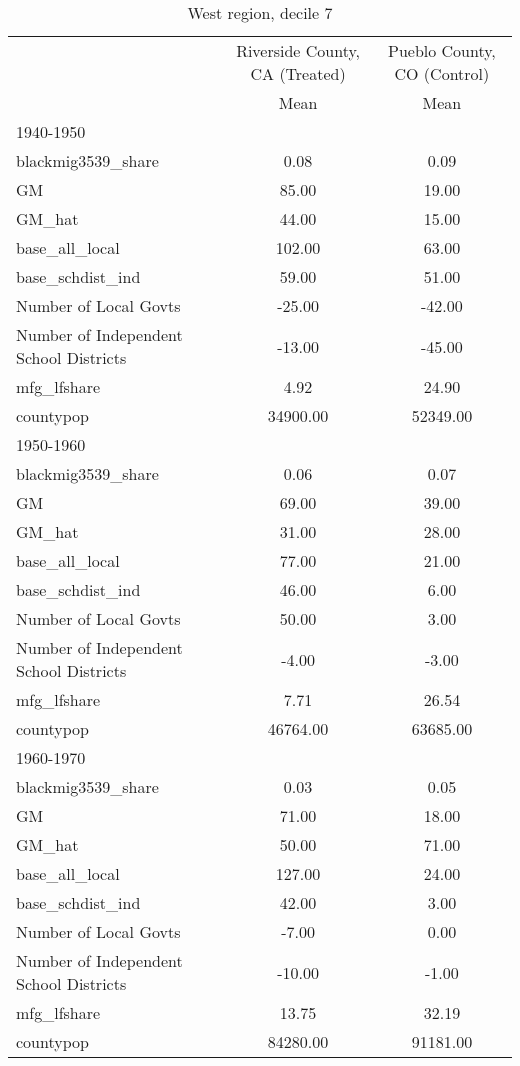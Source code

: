 \begin{table}[htbp]\centering
\def\sym#1{\ifmmode^{#1}\else\(^{#1}\)\fi}
\caption{West region, decile 7 \label{tab1}}
\begin{tabular}{l*{2}{c}}
\toprule
                    &\multicolumn{1}{c}{Riverside County, CA (Treated)}&\multicolumn{1}{c}{Pueblo County, CO (Control)}\\
                    &        Mean&        Mean\\
\midrule
1940-1950           &            &            \\
blackmig3539\_share  &        0.08&        0.09\\
GM                  &       85.00&       19.00\\
GM\_hat              &       44.00&       15.00\\
base\_all\_local      &      102.00&       63.00\\
base\_schdist\_ind    &       59.00&       51.00\\
Number of Local Govts&      -25.00&      -42.00\\
Number of Independent School Districts&      -13.00&      -45.00\\
mfg\_lfshare         &        4.92&       24.90\\
countypop           &    34900.00&    52349.00\\
\midrule
1950-1960           &            &            \\
blackmig3539\_share  &        0.06&        0.07\\
GM                  &       69.00&       39.00\\
GM\_hat              &       31.00&       28.00\\
base\_all\_local      &       77.00&       21.00\\
base\_schdist\_ind    &       46.00&        6.00\\
Number of Local Govts&       50.00&        3.00\\
Number of Independent School Districts&       -4.00&       -3.00\\
mfg\_lfshare         &        7.71&       26.54\\
countypop           &    46764.00&    63685.00\\
\midrule
1960-1970           &            &            \\
blackmig3539\_share  &        0.03&        0.05\\
GM                  &       71.00&       18.00\\
GM\_hat              &       50.00&       71.00\\
base\_all\_local      &      127.00&       24.00\\
base\_schdist\_ind    &       42.00&        3.00\\
Number of Local Govts&       -7.00&        0.00\\
Number of Independent School Districts&      -10.00&       -1.00\\
mfg\_lfshare         &       13.75&       32.19\\
countypop           &    84280.00&    91181.00\\
\bottomrule
\end{tabular}
\end{table}
